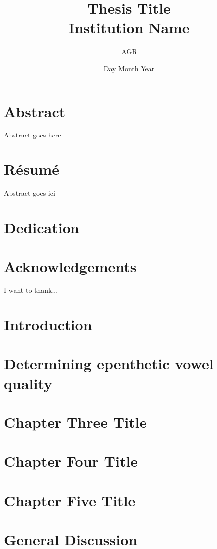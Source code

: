 \documentclass[12pt, twoside]{report}
\title{
	{Thesis Title}\\
	{\large Institution Name}\\
}
\author{AGR}
\date{Day Month Year}
\begin{document}
\maketitle

\chapter*{Abstract}
Abstract goes here

\chapter*{Résumé}
Abstract goes ici

\chapter*{Dedication}


\chapter*{Acknowledgements}
I want to thank...

\tableofcontents

\chapter{Introduction}


\chapter{{\color{red}Determining epenthetic vowel quality}}


\chapter{Chapter Three Title}


\chapter{Chapter Four Title}


\chapter{Chapter Five Title}


\chapter{General Discussion}


\appendix
\fancyhead{}
\fancyhead[RO,LE]{\nouppercase{\leftmark}}
\fancyfoot{}
\fancyfoot[LE,RO]{\thepage}




\end{document}
